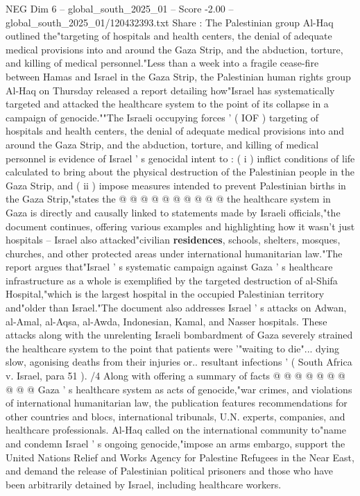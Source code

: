 \begin{textsample}{NEG Dim 6 – global\_south\_2025\_01 – Score -2.00 – global\_south\_2025\_01/120432393.txt}  \label{ex:f6_neg_001}
Share : The Palestinian group Al-Haq outlined the"targeting of hospitals and health centers, the denial of adequate medical provisions into and around the Gaza Strip, and the abduction, torture, and killing of medical personnel."Less than a week into a fragile cease-fire between Hamas and Israel in the Gaza Strip, the Palestinian human rights group Al-Haq on Thursday released a report detailing how"Israel has systematically targeted and attacked the healthcare system to the point of its collapse in a campaign of genocide.""The Israeli occupying forces ' ( IOF ) targeting of hospitals and health centers, the denial of adequate medical provisions into and around the Gaza Strip, and the abduction, torture, and killing of medical personnel is evidence of Israel ' s genocidal intent to : ( i ) inflict conditions of life calculated to bring about the physical destruction of the Palestinian people in the Gaza Strip, and ( ii ) impose measures intended to prevent Palestinian births in the Gaza Strip,"states the @ @ @ @ @ @ @ @ @ @ the healthcare system in Gaza is directly and causally linked to statements made by Israeli officials,"the document continues, offering various examples and highlighting how it wasn't just hospitals -- Israel also attacked"civilian \textbf{residences}, schools, shelters, mosques, churches, and other protected areas under international humanitarian law."The report argues that"Israel ' s systematic campaign against Gaza ' s healthcare infrastructure as a whole is exemplified by the targeted destruction of al-Shifa Hospital,"which is the largest hospital in the occupied Palestinian territory and"older than Israel."The document also addresses Israel ' s attacks on Adwan, al-Amal, al-Aqsa, al-Awda, Indonesian, Kamal, and Nasser hospitals.
These attacks along with the unrelenting Israeli bombardment of Gaza severely strained the healthcare system to the point that patients were '"waiting to die"... dying slow, agonising deaths from their injuries or.. resultant infections ' ( South Africa v.
Israel, para 51 ). /4 Along with offering a summary of facts @ @ @ @ @ @ @ @ @ @ Gaza ' s healthcare system as acts of genocide,"war crimes, and violations of international humanitarian law, the publication features recommendations for other countries and blocs, international tribunals, U.N. experts, companies, and healthcare professionals.
Al-Haq called on the international community to"name and condemn Israel ' s ongoing genocide,"impose an arms embargo, support the United Nations Relief and Works Agency for Palestine Refugees in the Near East, and demand the release of Palestinian political prisoners and those who have been arbitrarily detained by Israel, including healthcare workers.

\end{textsample}
